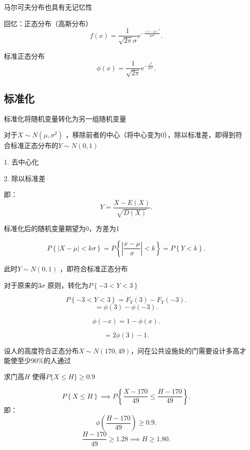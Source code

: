 \begin{notation}
	马尔可夫分布也具有无记忆性
\end{notation}
回忆：正态分布（高斯分布）
\[
	f\left( x \right) =\frac{1}{\sqrt{2\pi} \sigma}\mathrm{e}^{-\frac{ (x-\mu)^2 }{2\sigma^2}}
.\] 

标准正态分布\[
	\phi\left( x \right) =\frac{1}{\sqrt{2\pi} }\mathrm{e}^{-\frac{x^2}{2\sigma^2}}
.\] 
\subsection{标准化}%
\label{sub:标准化}
\begin{defi}
	标准化将随机变量转化为另一组随机变量

	对于$X\sim N\left( \mu,\sigma^2 \right) $ ，移除前者的中心（将中心变为0），除以标准差，即得到符合标准正态分布的$Y\sim N\left( 0,1 \right) $
\end{defi}

1. 去中心化

2. 除以标准差

即：
\[
	Y=\frac{X-E\left( X \right) }{\sqrt{D\left( X \right) } }
.\] 

标准化后的随机变量期望为0，方差为1

\[
	P\left\{ \left| X-\mu \right| <k\sigma \right\} =P\left\{ \left| \frac{x-\mu}{\sigma} \right| <k \right\} =P\left\{ Y<k \right\} 
.\] 

此时$Y\sim N\left( 0,1 \right) $ ，即符合标准正态分布

对于原来的$3\sigma$ 原则，转化为$P\left\{ -3<Y<3 \right\} $

\[
	P\left\{ -3<Y<3 \right\} = F_{Y}\left( 3 \right) -F_{Y}\left( -3 \right)
.\] 
\[
	=\phi\left( 3 \right) -\phi\left( -3 \right) 
.\] 
\begin{notation}
	 \[
		\phi\left( -x \right) =1-\phi\left( x \right)
	.\] 
\end{notation}
\[
	=2\phi\left( 3 \right) -1
.\] 

\begin{eg}
	设人的高度符合正态分布$X\sim N\left( 170,49 \right) $，问在公共设施处的门需要设计多高才能使至少90\%的人通过

	求门高$H$ 使得$P\{X\le H\}\ge 0.9$

	\[
		P\left\{ X\le H \right\} \implies P\left\{ \frac{X-170}{49}\le \frac{H-170}{49} \right\} 
	.\]
	即：
	\[
		\phi\left( \frac{H-170}{49} \right) \ge 0.9
	.\] 
	 \[
		\frac{H-170}{49}\ge 1.28 \implies H\ge 1.80
	.\] 
\end{eg}


